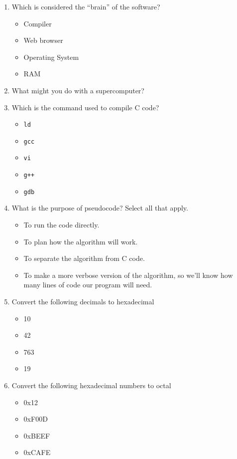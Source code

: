 \documentclass[letter,11pt]{article}
\begin{document}
\begin{enumerate}
    \item Which is considered the ``brain'' of the software?
    \begin{itemize}
        \item Compiler
        \item Web browser
        \item Operating System
        \item RAM
    \end{itemize}
    
    \item What might you do with a supercomputer?
    
    \item Which is the command used to compile C code?
    \begin{itemize}
        \item \texttt{ld}
        \item \texttt{gcc}
        \item \texttt{vi}
        \item \texttt{g++}
        \item \texttt{gdb}
    \end{itemize}
    
    \item What is the purpose of pseudocode? Select all that apply.
    \begin{itemize}
        \item To run the code directly.
        \item To plan how the algorithm will work.
        \item To separate the algorithm from C code.
        \item To make a more verbose version of the algorithm, so we'll know how many lines of code our program will need.
    \end{itemize}
    
    \item Convert the following decimals to hexadecimal
    \begin{itemize}
        \item 10
        \item 42
        \item 763
        \item 19
    \end{itemize}
    
    \item Convert the following hexadecimal numbers to octal
    \begin{itemize}
        \item 0x12
        \item 0xF00D
        \item 0xBEEF
        \item 0xCAFE
    \end{itemize}
    

\end{enumerate}
\end{document}
